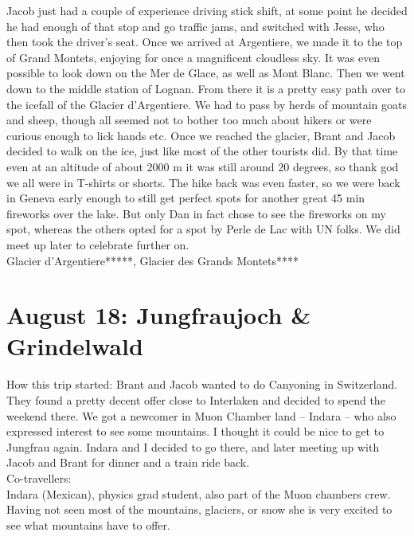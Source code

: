 Jacob just had a couple of experience driving stick shift, at some point he decided he had enough of that stop and go traffic jams, and switched with Jesse, who then took the driver's seat. Once we arrived at Argentiere, we made it to the top of Grand Montets, enjoying for once a magnificent cloudless sky. It was even possible to look down on the Mer de Glace, as well as Mont Blanc. Then we went down to the middle station of Lognan. From there it is a pretty easy path over to the icefall of the Glacier d'Argentiere. We had to pass by herds of mountain goats and sheep, though all seemed not to bother too much about hikers or were curious enough to lick hands etc. Once we reached the glacier, Brant and Jacob decided to walk on the ice, just like most of the other tourists did. By that time even at an altitude of about 2000 m it was still around 20 degrees, so thank god we all were in T-shirts or shorts. The hike back was even faster, so we were back in Geneva early enough to still get perfect spots for another great 45 min fireworks over the lake. But only Dan in fact chose to see the fireworks on my spot, whereas the others opted for a spot by Perle de Lac with UN folks. We did meet up later to celebrate further on.\\

Glacier d'Argentiere*****, Glacier des Grands Montets****

\section{August 18: Jungfraujoch \& Grindelwald}
\label{Jsungfrau2012}

How this trip started: Brant and Jacob wanted to do Canyoning in Switzerland. They found a pretty decent offer close to Interlaken and decided to spend the weekend there. We got a newcomer in Muon Chamber land -- Indara -- who also expressed interest to see some mountains. I thought it could be nice to get to Jungfrau again. Indara and I decided to go there, and later meeting up with Jacob and Brant for dinner and a train ride back.\\

Co-travellers:\\
Indara (Mexican), physics grad student, also part of the Muon chambers crew. Having not seen most of the mountains, glaciers, or snow she is very excited to see what mountains have to offer.\\

